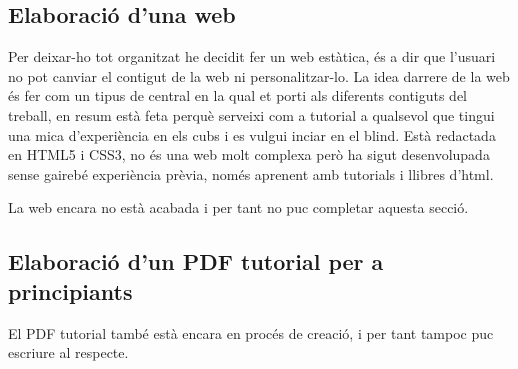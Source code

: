 \subsection{Elaboració d'una web}

Per deixar-ho tot organitzat he decidit fer un web estàtica, és a dir que l'usuari no pot canviar el contigut de la web ni personalitzar-lo. La idea darrere de la web és fer com un tipus de central en la qual et porti als diferents contiguts del treball, en resum està feta perquè serveixi com a tutorial a qualsevol que tingui una mica d'experiència en els cubs i es vulgui inciar en el blind.
Està redactada en HTML5 i CSS3, no és una web molt complexa però ha sigut desenvolupada sense gairebé experiència prèvia, només aprenent amb tutorials i llibres d'html.

La web encara no està acabada i per tant no puc completar aquesta secció.


\subsection{Elaboració d'un PDF tutorial per a principiants}

El PDF tutorial també està encara en procés de creació, i per tant tampoc puc escriure al respecte.





